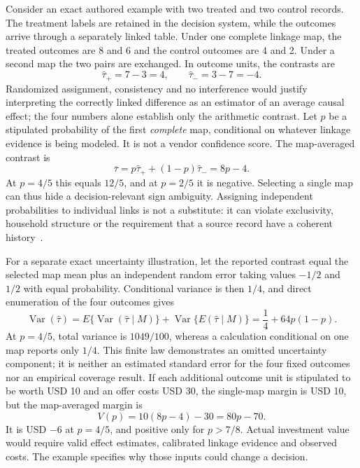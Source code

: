 Consider an exact authored example with two treated and two control records. The
treatment labels are retained in the decision system, while the outcomes arrive
through a separately linked table. Under one complete linkage map, the treated
outcomes are 8 and 6 and the control outcomes are 4 and 2. Under a second map the
two pairs are exchanged. In outcome units, the contrasts are
\begin{equation}
 \widehat\tau_{+}=7-3=4,\qquad
 \widehat\tau_{-}=3-7=-4.
 \label{exec22:obs-maps}
\end{equation}
Randomized assignment, consistency and no interference would justify interpreting
the correctly linked difference as an estimator of an average causal effect;
the four numbers alone establish only the arithmetic contrast. Let $p$ be a
stipulated probability of the first \emph{complete} map, conditional on whatever
linkage evidence is being modeled. It is not a vendor confidence score. The
map-averaged contrast is
\begin{equation}
 \overline\tau=p\widehat\tau_{+}+(1-p)\widehat\tau_{-}=8p-4.
 \label{exec22:obs-mixture}
\end{equation}
At $p=4/5$ this equals $12/5$, and at $p=2/5$ it is negative. Selecting a single
map can thus hide a decision-relevant sign ambiguity. Assigning independent
probabilities to individual links is not a substitute: it can violate exclusivity,
household structure or the requirement that a source record have a coherent
history~\citep{exec22_obs_reference}.

For a separate exact uncertainty illustration, let the reported contrast equal
the selected map mean plus an independent random error taking values $-1/2$ and
$1/2$ with equal probability. Conditional variance is then $1/4$, and direct
enumeration of the four outcomes gives
\begin{equation}
 \operatorname{Var}(\widehat\tau)
 =E\{\operatorname{Var}(\widehat\tau\mid M)\}
  +\operatorname{Var}\{E(\widehat\tau\mid M)\}
 =\frac14+64p(1-p).
 \label{exec22:obs-variance}
\end{equation}
At $p=4/5$, total variance is $1049/100$, whereas a calculation conditional on one
map reports only $1/4$. This finite law demonstrates an omitted uncertainty
component; it is neither an estimated standard error for the four fixed outcomes
nor an empirical coverage result. If each additional outcome unit is stipulated
to be worth USD 10 and an offer costs USD 30, the single-map margin is USD 10,
but the map-averaged margin is
\begin{equation}
 V(p)=10(8p-4)-30=80p-70.
 \label{exec22:obs-value}
\end{equation}
It is USD $-6$ at $p=4/5$, and positive only for $p>7/8$. Actual investment value
would require valid effect estimates, calibrated linkage evidence and observed
costs. The example specifies why those inputs could change a decision.

